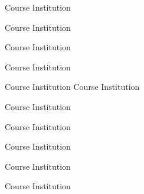 
\cvachievement
{\faFa}
{Course}
{Institution}

\divider

\cvachievement
{\faBarChart}
{Course}
{Institution}

\divider

\cvachievement
{\faBarChart}
{Course}
{Institution}

\divider

\cvachievement
{\faCode}
{Course}
{Institution}

\divider

\cvachievement
{\faUsers}
{Course}
{Institution}
\cvachievement
{\faGraduationCap}
{Course}
{Institution}

\divider

\cvachievement
{\faGraduationCap}
{Course}
{Institution}

\divider

\cvachievement
{\faArchive}
{Course}
{Institution}

\divider

\cvachievement
{\faTrophy}
{Course}
{Institution}

\divider

\cvachievement
{\faTrophy}
{Course}
{Institution}

\divider

\cvachievement
{\faBook}
{Course}
{Institution}